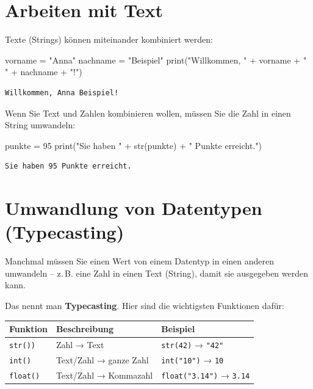 \documentclass[
  letterpaper,
  DIV=11,
  numbers=noendperiod]{scrreprt}
\newenvironment{Shaded}{\begin{snugshade}}{\end{snugshade}}
\newcommand{\BuiltInTok}[1]{\textcolor[rgb]{0.00,0.23,0.31}{#1}}
\newcommand{\DecValTok}[1]{\textcolor[rgb]{0.68,0.00,0.00}{#1}}
\newcommand{\NormalTok}[1]{\textcolor[rgb]{0.00,0.23,0.31}{#1}}
\newcommand{\OperatorTok}[1]{\textcolor[rgb]{0.37,0.37,0.37}{#1}}
\newcommand{\StringTok}[1]{\textcolor[rgb]{0.13,0.47,0.30}{#1}}
\begin{document}
\section{Arbeiten mit Text}\label{arbeiten-mit-text}

Texte (Strings) können miteinander kombiniert werden:

\begin{Shaded}
\begin{Highlighting}[]
\NormalTok{vorname }\OperatorTok{=} \StringTok{"Anna"}
\NormalTok{nachname }\OperatorTok{=} \StringTok{"Beispiel"}
\BuiltInTok{print}\NormalTok{(}\StringTok{"Willkommen, "} \OperatorTok{+}\NormalTok{ vorname }\OperatorTok{+} \StringTok{" "} \OperatorTok{+}\NormalTok{ nachname }\OperatorTok{+} \StringTok{"!"}\NormalTok{)}
\end{Highlighting}
\end{Shaded}

\begin{verbatim}
Willkommen, Anna Beispiel!
\end{verbatim}

Wenn Sie Text und Zahlen kombinieren wollen, müssen Sie die Zahl in
einen String umwandeln:

\begin{Shaded}
\begin{Highlighting}[]
\NormalTok{punkte }\OperatorTok{=} \DecValTok{95}
\BuiltInTok{print}\NormalTok{(}\StringTok{"Sie haben "} \OperatorTok{+} \BuiltInTok{str}\NormalTok{(punkte) }\OperatorTok{+} \StringTok{" Punkte erreicht."}\NormalTok{)}
\end{Highlighting}
\end{Shaded}

\begin{verbatim}
Sie haben 95 Punkte erreicht.
\end{verbatim}

\section{Umwandlung von Datentypen
(Typecasting)}\label{umwandlung-von-datentypen-typecasting}

Manchmal müssen Sie einen Wert von einem Datentyp in einen anderen
umwandeln -- z.\,B. eine Zahl in einen Text (String), damit sie
ausgegeben werden kann.

Das nennt man \textbf{Typecasting}. Hier sind die wichtigsten Funktionen
dafür:

\begin{longtable}[]{@{}lll@{}}
\toprule\noalign{}
Funktion & Beschreibung & Beispiel \\
\midrule\noalign{}
\endhead
\bottomrule\noalign{}
\endlastfoot
\texttt{str())} & Zahl → Text & \texttt{str(42)} → \texttt{"42"} \\
\texttt{int()} & Text/Zahl → ganze Zahl & \texttt{int("10")} →
\texttt{10} \\
\texttt{float()} & Text/Zahl → Kommazahl & \texttt{float("3.14")} →
\texttt{3.14} \\
\end{longtable}
\end{document}
